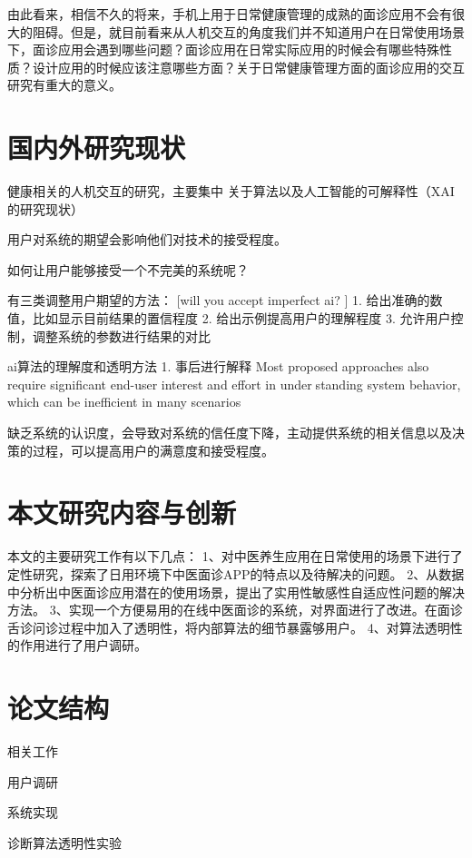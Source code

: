 由此看来，相信不久的将来，手机上用于日常健康管理的成熟的面诊应用不会有很大的阻碍。但是，就目前看来从人机交互的角度我们并不知道用户在日常使用场景下，面诊应用会遇到哪些问题？面诊应用在日常实际应用的时候会有哪些特殊性质？设计应用的时候应该注意哪些方面？关于日常健康管理方面的面诊应用的交互研究有重大的意义。

\section{国内外研究现状}
健康相关的人机交互的研究，主要集中
关于算法以及人工智能的可解释性（XAI的研究现状）


用户对系统的期望会影响他们对技术的接受程度。

如何让用户能够接受一个不完美的系统呢？

有三类调整用户期望的方法： [will you accept imperfect ai? ]
1. 给出准确的数值，比如显示目前结果的置信程度
2. 给出示例提高用户的理解程度
3. 允许用户控制，调整系统的参数进行结果的对比


ai算法的理解度和透明方法
1. 事后进行解释  Most proposed approaches
also require significant end-user interest and effort in understanding system behavior, which can be inefficient in many
scenarios

缺乏系统的认识度，会导致对系统的信任度下降，主动提供系统的相关信息以及决策的过程，可以提高用户的满意度和接受程度。

\section{本文研究内容与创新}

本文的主要研究工作有以下几点：
1、对中医养生应用在日常使用的场景下进行了定性研究，探索了日用环境下中医面诊APP的特点以及待解决的问题。
2、从数据中分析出中医面诊应用潜在的使用场景，提出了实用性敏感性自适应性问题的解决方法。
3、实现一个方便易用的在线中医面诊的系统，对界面进行了改进。在面诊舌诊问诊过程中加入了透明性，将内部算法的细节暴露够用户。
4、对算法透明性的作用进行了用户调研。

\section{论文结构}

相关工作

用户调研

系统实现

诊断算法透明性实验